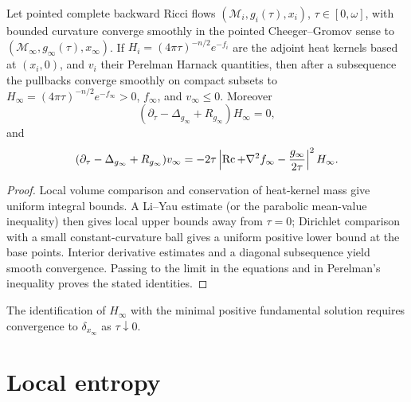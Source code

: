 \begin{lemma}
\label{lem:chow-iii-heat-kernel-cheeger-gromov}

Let pointed complete backward Ricci flows \((\mathcal M_i,g_i(\tau),x_i)\),
\(\tau\in[0,\omega]\), with bounded curvature converge smoothly in the pointed
Cheeger--Gromov sense to \((\mathcal M_\infty,g_\infty(\tau),x_\infty)\).  If
\(H_i=(4\pi\tau)^{-n/2}e^{-f_i}\) are the adjoint heat kernels based at
\((x_i,0)\), and \(v_i\) their Perelman Harnack quantities, then after a
subsequence the pullbacks converge smoothly on compact subsets to
\(H_\infty=(4\pi\tau)^{-n/2}e^{-f_\infty}>0\), \(f_\infty\), and \(v_\infty\le0\).
Moreover
\[
 (\partial_\tau-\Delta_{g_\infty}+R_{g_\infty})H_\infty=0,
\]
and
\[
 (\partial_\tau-\Delta_{g_\infty}+R_{g_\infty})v_\infty
 =-2\tau\left|\operatorname{Rc}+\nabla^2f_\infty-\frac{g_\infty}{2\tau}\right|^2H_\infty.
\]
\end{lemma}
\begin{proof}
\sketch Local volume comparison and conservation of heat-kernel mass give uniform
integral bounds.  A Li--Yau estimate (or the parabolic mean-value inequality)
then gives local upper bounds away from \(\tau=0\); Dirichlet comparison with
a small constant-curvature ball gives a uniform positive lower bound at the
base points.  Interior derivative estimates and a diagonal subsequence yield
smooth convergence.  Passing to the limit in the equations and in
Perelman's inequality proves the stated identities.
\end{proof}

\begin{remark}
\label{rem:chow-iii-heat-kernel-minimality}


The identification of \(H_\infty\) with the minimal positive fundamental
solution requires convergence to \(\delta_{x_\infty}\) as
\(\tau\downarrow0\).
\end{remark}

\section{Local entropy}

